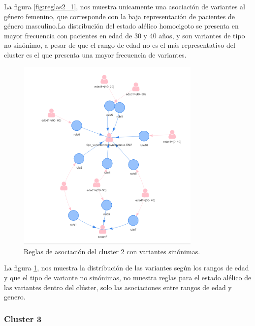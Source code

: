 La figura \ref{fig:reglas2_1}, nos muestra unicamente una asociación de variantes al género femenino, que corresponde con la baja representación de pacientes de género  masculino.La distribución del estado alélico homocigoto se presenta en mayor frecuencia con pacientes en edad de 30 y 40 años, y son variantes de tipo no sinónimo, a pesar de que el rango de edad no es el más representativo del cluster es el que presenta una mayor frecuencia de variantes.
 
\begin{figure}[H]
	\centering
	\includegraphics[width=0.8\textwidth]{Kap4/reglas2_2}
	\caption{Reglas de asociación del cluster 2 con variantes sinónimas.} \label{fig:reglas2_2}
\end{figure}

La figura \ref{fig:reglas2_2}, nos muestra la distribución de las variantes según los rangos de edad y que el tipo de variante no sinónimas, no muestra reglas para el estado alélico de las variantes dentro del clúster, solo las asociaciones entre rangos de edad y genero. 

\subsubsection*{Cluster 3}

